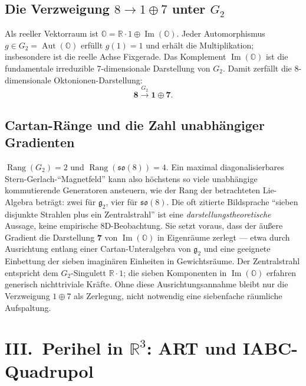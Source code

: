 \documentclass[11pt,a4paper]{article}
\theoremstyle{definition}
\theoremstyle{remark}
\newcommand{\so}{\mathfrak{so}}
\newcommand{\gtwo}{\mathfrak{g}_2}
\newcommand{\ImO}{\operatorname{Im}}
\newcommand{\Aut}{\operatorname{Aut}}
\newcommand{\R}{\mathbb{R}}
\newcommand{\OO}{\mathbb{O}}
\begin{document}
\subsection{Die Verzweigung \texorpdfstring{\(8\to 1\oplus 7\)}{8 -> 1 + 7} unter \texorpdfstring{\(G_2\)}{G2}}

Als reeller Vektorraum ist \(\OO=\R\cdot 1\oplus\ImO(\OO)\). Jeder Automorphismus
\(g\in G_2=\Aut(\OO)\) erfüllt \(g(1)=1\) und erhält die Multiplikation; insbesondere ist
die reelle Achse Fixgerade. Das Komplement \(\ImO(\OO)\) ist die fundamentale irreduzible
7-dimensionale Darstellung von \(G_2\). Damit zerfällt die 8-dimensionale
Oktonionen-Darstellung:
\begin{equation}
  \mathbf{8}\xrightarrow{G_2}\mathbf{1}\oplus\mathbf{7}.
\end{equation}

\subsection{Cartan-Ränge und die Zahl unabhängiger Gradienten}

\(\operatorname{Rang}(G_2)=2\) und \(\operatorname{Rang}(\so(8))=4\). Ein maximal
diagonalisierbares Stern-Gerlach-``Magnetfeld'' kann also höchstens so viele unabhängige
kommutierende Generatoren ansteuern, wie der Rang der betrachteten Lie-Algebra beträgt:
zwei für \(\gtwo\), vier für \(\so(8)\). Die oft zitierte Bildsprache ``sieben disjunkte
Strahlen plus ein Zentralstrahl'' ist eine \emph{darstellungstheoretische} Aussage, keine
empirische 8D-Beobachtung. Sie setzt voraus, dass der äußere Gradient die Darstellung
\(\mathbf{7}\) von \(\ImO(\OO)\) in Eigenräume zerlegt --- etwa durch Ausrichtung entlang
einer Cartan-Unteralgebra von \(\gtwo\) und eine geeignete Einbettung der sieben imaginären
Einheiten in Gewichtsräume. Der Zentralstrahl entspricht dem \(G_2\)-Singulett
\(\R\cdot 1\); die sieben Komponenten in \(\ImO(\OO)\) erfahren generisch nichttriviale
Kräfte. Ohne diese Ausrichtungsannahme bleibt nur die Verzweigung \(1\oplus 7\) als
Zerlegung, nicht notwendig eine siebenfache räumliche Aufspaltung.

\section{III.\ Perihel in \texorpdfstring{\(\R^3\)}{R\string^3}: ART und IABC-Quadrupol}
\end{document}
